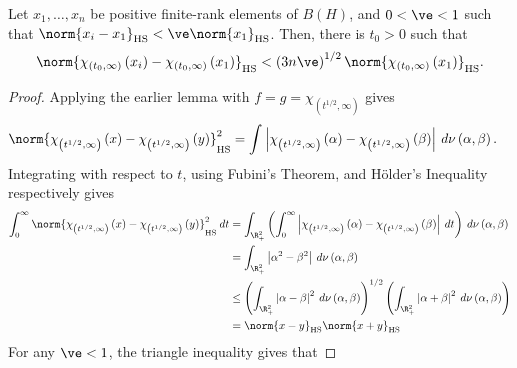 \documentclass[10pt]{mypackage}
\begin{document}
\begin{theorem}
  Let $x_1,\dots,x_n$ be positive finite-rank elements of $B(H)$, and $0 < \ve < 1$ such that $\norm{x_i-x_1}_{\operatorname{HS}} < \ve \norm{x_1}_{\operatorname{HS}}$. Then, there is $t_0 > 0$ such that
  \begin{align*}
    \norm{\chi_{\left( t_0,\infty \right)}\left( x_i \right) - \chi_{\left( t_0,\infty \right)}\left( x_1 \right)}_{\operatorname{HS}} < \left( 3n\ve \right)^{1/2} \norm{\chi_{\left( t_0,\infty \right)}\left( x_1 \right)}_{\operatorname{HS}}.
  \end{align*}
\end{theorem}
\begin{proof}
  Applying the earlier lemma with $f = g = \chi_{\left( t^{1/2},\infty \right)}$ gives
  \begin{align*}
    \norm{\chi_{\left( t^{1/2},\infty \right)}\left( x \right) - \chi_{\left( t^{1/2},\infty \right)}\left( y \right)}_{\operatorname{HS}}^2 &= \int_{}^{} \left\vert \chi_{\left( t^{1/2},\infty \right)}\left( \alpha \right) - \chi_{\left( t^{1/2},\infty \right)}\left( \beta \right) \right\vert\:d\nu\left( \alpha,\beta \right).
  \end{align*}
  Integrating with respect to $t$, using Fubini's Theorem, and Hölder's Inequality respectively gives
  \begin{align*}
    \int_{0}^{\infty} \norm{\chi_{\left( t^{1/2},\infty \right)}\left( x \right) - \chi_{\left( t^{1/2},\infty \right)}\left( y \right)}_{\operatorname{HS}}^2\:dt &= 
    \int_{\R^2_{+}}^{} \left( \int_{0}^{\infty} \left\vert \chi_{\left( t^{1/2},\infty \right)}\left( \alpha \right) - \chi_{\left( t^{1/2},\infty \right)}\left( \beta \right) \right\vert\:dt \right)\:d\nu\left( \alpha,\beta \right)\\
                                                                 &= \int_{\R_{+}^2}^{} \left\vert \alpha^2-\beta^2 \right\vert\:d\nu\left( \alpha,\beta \right)\\
                                                                 &\leq \left( \int_{\R^2_{+}}^{} \left\vert \alpha-\beta \right\vert^2\:d\nu\left( \alpha,\beta \right) \right)^{1/2} \left( \int_{\R^2_{+}}^{} \left\vert \alpha + \beta \right\vert^2\:d\nu\left( \alpha,\beta \right) \right)\\
                                                                      &= \norm{x-y}_{\operatorname{HS}}\norm{x+y}_{\operatorname{HS}}
  \end{align*}
  For any $\ve < 1$, the triangle inequality gives that

\end{proof}
\end{document}
